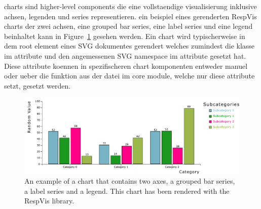
charts sind higher-level components die eine vollstaendige visualisierung inklusive achsen, legenden und series representieren.
ein beispiel eines gerenderten RespVis charts der zwei achsen, eine grouped bar series, eine label series und eine legend beinhaltet kann in Figure~\ref{fig:Chart} gesehen werden.
Ein chart wird typischerweise in dem root  element eines SVG dokumentes gerendert welches zumindest die  klasse im  attribute und den angemessenen SVG namespace im  attribute gesetzt hat.
Diese attribute koennen in spezifischeren chart komponenten entweder manuel oder ueber die  funktion aus der  datei im core module, welche nur diese attribute setzt, gesetzt werden.

\begin{figure}[tp]
  \centering
  \includegraphics[keepaspectratio,width=\linewidth,height=\fullh]{diagrams/chart.pdf}
  \caption[Chart Example]{
    An example of a chart that contains two axes, a grouped bar series, a label series and a legend.
    This chart has been rendered with the RespVis library.
  }
  \label{fig:Chart}
\end{figure}

